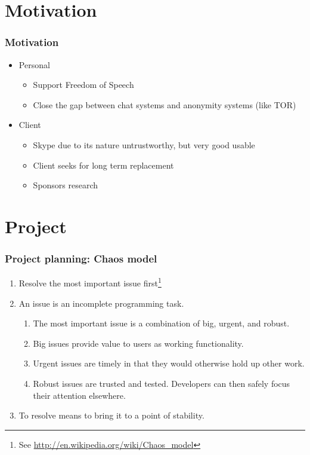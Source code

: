 \documentclass{beamer}
\begin{document}
\section{Motivation}
\frame
{
  \frametitle{Motivation}
  \begin{itemize}
     \item Personal
     \begin{itemize}
        \item Support Freedom of Speech
        \item Close the gap between chat systems and anonymity systems (like TOR)
    \end{itemize}
     \item Client
     \begin{itemize}
        \item Skype due to its nature untrustworthy, but very good usable
        \item Client seeks for long term replacement 
        \item Sponsors research
    \end{itemize}
  \end{itemize}
}

\section{Project}
\frame
{
  \frametitle{Project planning: Chaos model}
  \begin{enumerate}
     \item Resolve the most important issue first\footnote{See \url{http://en.wikipedia.org/wiki/Chaos_model}}
     \item An issue is an incomplete programming task.
      \begin{enumerate}
         \item The most important issue is a combination of big, urgent, and robust.
         \item Big issues provide value to users as working functionality.
         \item Urgent issues are timely in that they would otherwise hold up other work.
         \item Robust issues are trusted and tested. Developers can then safely focus their attention elsewhere.
      \end{enumerate}
     \item To resolve means to bring it to a point of stability.
  \end{enumerate}
}
\end{document}
